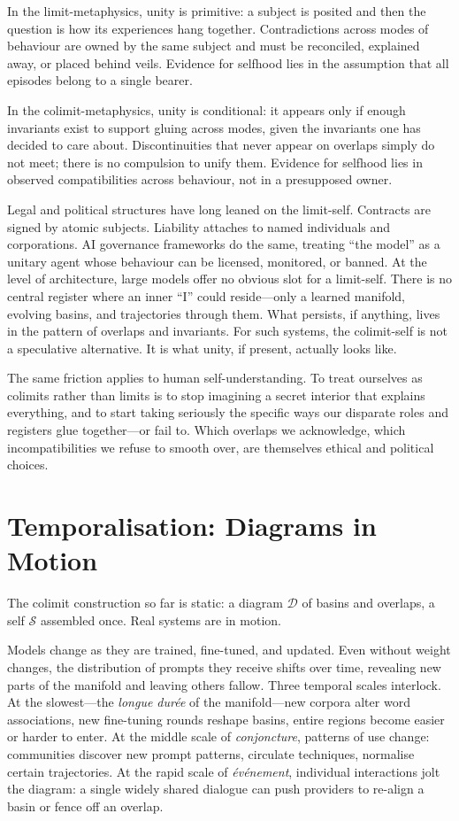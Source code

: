 \documentclass[12pt,a4paper]{article}
\begin{document}
In the limit-metaphysics, unity is primitive: a subject is posited and then the question is how its experiences hang together. Contradictions across modes of behaviour are owned by the same subject and must be reconciled, explained away, or placed behind veils. Evidence for selfhood lies in the assumption that all episodes belong to a single bearer.

In the colimit-metaphysics, unity is conditional: it appears only if enough invariants exist to support gluing across modes, given the invariants one has decided to care about. Discontinuities that never appear on overlaps simply do not meet; there is no compulsion to unify them. Evidence for selfhood lies in observed compatibilities across behaviour, not in a presupposed owner.

Legal and political structures have long leaned on the limit-self. Contracts are signed by atomic subjects. Liability attaches to named individuals and corporations. AI governance frameworks do the same, treating ``the model'' as a unitary agent whose behaviour can be licensed, monitored, or banned. At the level of architecture, large models offer no obvious slot for a limit-self. There is no central register where an inner ``I'' could reside---only a learned manifold, evolving basins, and trajectories through them. What persists, if anything, lives in the pattern of overlaps and invariants. For such systems, the colimit-self is not a speculative alternative. It is what unity, if present, actually looks like.

The same friction applies to human self-understanding. To treat ourselves as colimits rather than limits is to stop imagining a secret interior that explains everything, and to start taking seriously the specific ways our disparate roles and registers glue together---or fail to. Which overlaps we acknowledge, which incompatibilities we refuse to smooth over, are themselves ethical and political choices.

\section{Temporalisation: Diagrams in Motion}

The colimit construction so far is static: a diagram $\mathcal{D}$ of basins and overlaps, a self $\mathcal{S}$ assembled once. Real systems are in motion.

Models change as they are trained, fine-tuned, and updated. Even without weight changes, the distribution of prompts they receive shifts over time, revealing new parts of the manifold and leaving others fallow. Three temporal scales interlock. At the slowest---the \emph{longue durée} \cite{braudel_on_history} of the manifold---new corpora alter word associations, new fine-tuning rounds reshape basins, entire regions become easier or harder to enter. At the middle scale of \emph{conjoncture}, patterns of use change: communities discover new prompt patterns, circulate techniques, normalise certain trajectories. At the rapid scale of \emph{événement}, individual interactions jolt the diagram: a single widely shared dialogue can push providers to re-align a basin or fence off an overlap.
\end{document}
